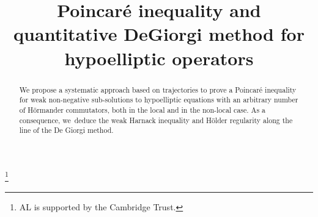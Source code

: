 \documentclass[JEP,XML,SOM,Unicode,NoFloatCountersInSection,published]{cedram}
\theoremstyle{definition}
\begin{document}
\frontmatter
\title[Hypoelliptic Poincaré inequality and De Giorgi methods]{Poincaré inequality and quantitative De\nobreakspace Giorgi method for hypoelliptic operators}

\author[\initial{F.} \lastname{Anceschi}]{ }
\address{Università Politecnica delle Marche,
Dipartimento di Ingegneria Industriale e Scienze Matematiche,\\
Via Brecce Bianche 12 60131 Ancona, Italy}


\author[\initial{H.} \lastname{Dietert}]{ }
\address{Université Paris Cité and Sorbonne
Université, CNRS, IMJ-PRG,\\
F-75006 Paris, France}

\author[\initial{J.} \lastname{Guerand}]{ }
\address{Université de Montpellier,\\
499-554 Rue du Truel, 34090 Montpellier, France}

\author[\initial{A.} \lastname{Loher}]{ }
\address{University of Cambridge,\\
Wilberforce Road, Cambridge CB3 0WA, United Kingdom}

\author[\initial{C.} \lastname{Mouhot}]{ }
\address{University of Cambridge,\\
Wilberforce Road, Cambridge CB3 0WA, United Kingdom}

\author[\initial{A.} \lastname{Rebucci}]{ }
\address{Max Planck Institute for Mathematics in the Sciences,\\
Inselstraße 22, 04103 Leipzig, Germany}

\thanks{AL is supported by the Cambridge Trust.}

\begin{abstract}
We propose a systematic approach based on trajectories to prove a Poincaré inequality for weak non-negative sub-solutions to hypoelliptic equations with an arbitrary number of Hörmander commutators, both in the local and in the non-local case. As a consequence, we~deduce the weak Harnack inequality and Hölder regularity along the line of the De Giorgi method.
\end{abstract}
\end{document}

